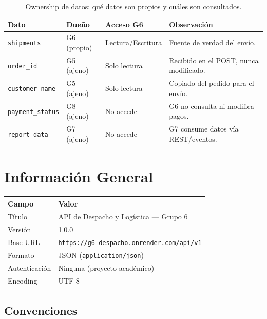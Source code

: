 \documentclass[11pt, a4paper]{article}
\begin{document}
\begin{table}[ht!]
\centering
\renewcommand{\arraystretch}{1.4}
\begin{tabularx}{\textwidth}{l l l X}
  \toprule
  \textbf{Dato} & \textbf{Dueño} & \textbf{Acceso G6} & \textbf{Observación} \\
  \midrule
  \texttt{shipments}        & G6 (propio)  & Lectura/Escritura & Fuente de verdad del envío. \\
  \texttt{order\_id}        & G5 (ajeno)   & Solo lectura      & Recibido en el POST, nunca modificado. \\
  \texttt{customer\_name}   & G5 (ajeno)   & Solo lectura      & Copiado del pedido para el envío. \\
  \texttt{payment\_status}  & G8 (ajeno)   & No accede          & G6 no consulta ni modifica pagos. \\
  \texttt{report\_data}     & G7 (ajeno)   & No accede          & G7 consume datos vía REST/eventos. \\
  \bottomrule
\end{tabularx}
\caption{Ownership de datos: qué datos son propios y cuáles son consultados.}
\end{table}


\section{Información General}
\label{sec:general-info}

\begin{table}[ht!]
\centering
\renewcommand{\arraystretch}{1.4}
\begin{tabularx}{\textwidth}{l X}
  \toprule
  \textbf{Campo} & \textbf{Valor} \\
  \midrule
  Título          & API de Despacho y Logística --- Grupo 6 \\
  Versión         & 1.0.0 \\
  Base URL        & \texttt{https://g6-despacho.onrender.com/api/v1} \\
  Formato         & JSON (\texttt{application/json}) \\
  Autenticación   & Ninguna (proyecto académico) \\
  Encoding        & UTF-8 \\
  \bottomrule
\end{tabularx}
\end{table}

\subsection{Convenciones}
\end{document}
